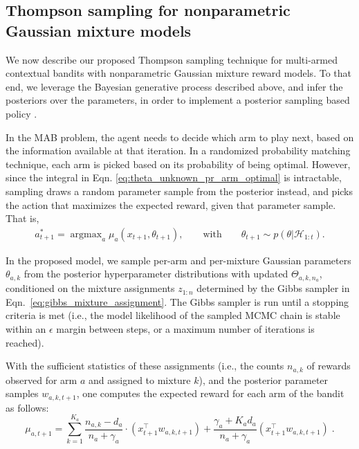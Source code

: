 \documentclass{article}
\newcommand{\ie}{i.e., }
\newcommand{\argmax}{\mathop{\mathrm{argmax}}}
\begin{document}
\subsection{Thompson sampling for nonparametric Gaussian mixture models}
\label{ssec:nonparametric_thompson_sampling}

We now describe our proposed Thompson sampling technique for multi-armed contextual bandits with nonparametric Gaussian mixture reward models. To that end, we leverage the Bayesian generative process described above, and infer the posteriors over the parameters, in order to implement a posterior sampling based policy \cite{j-Russo2014}.

In the MAB problem, the agent needs to decide which arm to play next, based on the information available at that iteration.
In a randomized probability matching technique, each arm is picked based on its probability of being optimal. However, since the integral in Eqn. \eqref{eq:theta_unknown_pr_arm_optimal} is intractable, \citet{j-Thompson1935} sampling draws a random parameter sample from the posterior instead, and picks the action that maximizes the expected reward, given that parameter sample. That is, 
\begin{equation}
\begin{split}
a_{t+1}^*=\argmax_{a}\mu_{a}(x_{t+1},\theta_{t+1}), \qquad  \text{with} \qquad \theta_{t+1} \sim p(\theta|\mathcal{H}_{1:t}) .
\end{split}
\end{equation}

In the proposed model, we sample per-arm and per-mixture Gaussian parameters $\theta_{a,k}$ from the posterior hyperparameter distributions with updated $\Theta_{a,k,n_a}$, conditioned on the mixture assignments $z_{1:n}$ determined by the Gibbs sampler in Eqn.~\eqref{eq:gibbs_mixture_assignment}. The Gibbs sampler is run until a stopping criteria is met (\ie the model likelihood of the sampled MCMC chain is stable within an $\epsilon$ margin between steps, or a maximum number of iterations is reached).

With the sufficient statistics of these assignments (\ie the counts $n_{a,k}$ of rewards observed for arm $a$ and assigned to mixture $k$), and the posterior parameter samples $w_{a,k,t+1}$, one computes the expected reward for each arm of the bandit as follows:
\begin{equation}
\mu_{a,t+1}=\sum_{k=1}^{K_a} \frac{n_{a,k}-d_a}{n_a+\gamma_a} \cdot \left(x_{t+1}^\top w_{a,k,t+1}\right) + \frac{\gamma_a+K_ad_a}{n_a+\gamma_a} \left(x_{t+1}^\top w_{a,k,t+1} \right)\; .
\label{eq:nonparametric_expected_reward}
\end{equation}
\end{document}
